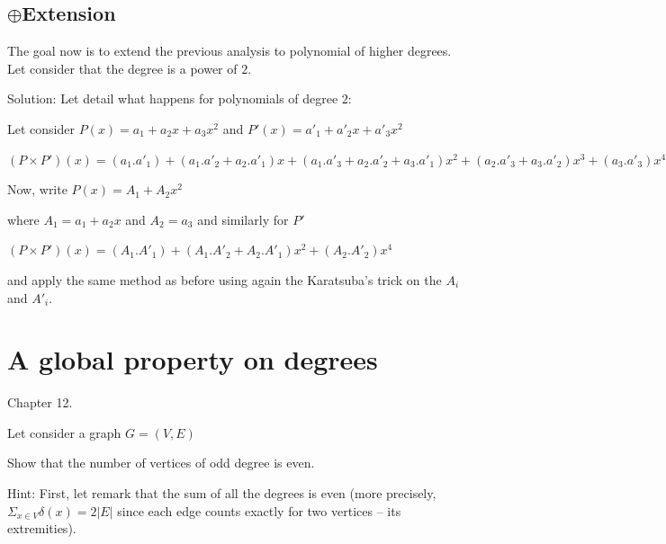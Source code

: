 \documentclass{article}[12pt]
\begin{document}
\subsection{$\oplus$Extension}

The goal now is to extend the previous analysis to polynomial of higher degrees.
Let consider that the degree is a power of $2$.
\bigskip

Solution:
Let detail what happens for polynomials of degree $2$:

Let consider $P(x) = a_1 + a_2 x + a_3 x^2$ and $P'(x) = a'_1 + a'_2 x + a'_3 x^2$

$(P \times P')(x) = (a_1.a'_1) + (a_1.a'_2 + a_2.a'_1) x + (a_1.a'_3 + a_2.a'_2 + a_3.a'_1) x^2 + (a_2.a'_3 + a_3.a'_2) x^3 +  (a_3.a'_3) x^4$
\bigskip

Now, write $P(x) = A_1 + A_2 x^2$ 

where $A_1 = a_1 + a_2 x$ and $A_2 = a_3$ and similarly for $P'$

$(P \times P')(x) = (A_1.A'_1) + (A_1.A'_2 + A_2.A'_1) x^2 + (A_2.A'_2) x^4$ 

and apply the same method as before using again the Karatsuba's trick on the $A_i$ and $A'_i$.



\section{A global property on degrees}

Chapter 12.

Let consider a graph $G=(V,E)$

Show that the number of vertices of odd degree is even.

Hint:
First, let remark that the sum of all the degrees is even
(more precisely, $\Sigma_{x \in V} \delta(x) = 2 |E|$ since each edge counts exactly for two vertices -- its extremities). 

%
%
%
%
%
\end{document}
